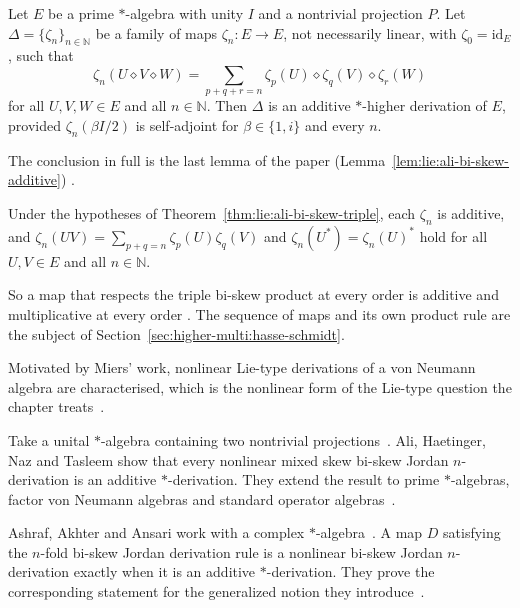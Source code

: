 \begin{theorem}\label{thm:lie:ali-bi-skew-triple}
Let $E$ be a prime $*$-algebra with unity $I$ and a nontrivial projection $P$.
Let $\Delta=\{\zeta_{n}\}_{n\in\mathbb{N}}$ be a family of maps
$\zeta_{n}\colon E\to E$, not necessarily linear, with
$\zeta_{0}=\mathrm{id}_{E}$, such that
\[
\zeta_{n}(U\diamond V\diamond W)
=\sum_{p+q+r=n}\zeta_{p}(U)\diamond\zeta_{q}(V)\diamond\zeta_{r}(W)
\]
for all $U,V,W\in E$ and all $n\in\mathbb{N}$. Then $\Delta$ is an additive
$*$-higher derivation of $E$, provided $\zeta_{n}(\beta I/2)$ is self-adjoint
for $\beta\in\{1,i\}$ and every $n$.
\end{theorem}

The conclusion in full is the last lemma of the paper
(Lemma~\ref{lem:lie:ali-bi-skew-additive}) \cite[p.~136]{AliAliTasleem2026}.

\begin{lemma}\label{lem:lie:ali-bi-skew-additive}
Under the hypotheses of Theorem~\ref{thm:lie:ali-bi-skew-triple}, each
$\zeta_{n}$ is additive, and
$\zeta_{n}(UV)=\sum_{p+q=n}\zeta_{p}(U)\zeta_{q}(V)$ and
$\zeta_{n}(U^{*})=\zeta_{n}(U)^{*}$ hold for all $U,V\in E$ and all $n\in\mathbb{N}$.
\end{lemma}

So a map that respects the triple bi-skew product at every order is additive
and multiplicative at every order \cite[p.~136]{AliAliTasleem2026}. The
sequence of maps and its own product rule are the subject of
Section~\ref{sec:higher-multi:hasse-schmidt}.

Motivated by Miers' work, nonlinear Lie-type derivations of a von Neumann
algebra are characterised, which is the nonlinear form of the Lie-type
question the chapter treats~\cite{WlNonlinearLieTypeDerivationsOfV2013}.

Take a unital $*$-algebra containing two nontrivial projections~\cite{WlNonlinearMixedSkewBiSkewJordan2026}. Ali,
Haetinger, Naz and Tasleem show that every nonlinear mixed skew bi-skew Jordan
$n$-derivation is an additive $*$-derivation. They extend the result to prime %
$*$-algebras, factor von Neumann algebras and standard operator
algebras~\cite{WlNonlinearMixedSkewBiSkewJordan2026}.

Ashraf, Akhter and Ansari work with a complex $*$-algebra~\cite{WlNonlinearGeneralizedBiSkewJord2024}. A map $D$
satisfying the $n$-fold bi-skew Jordan derivation rule is a nonlinear bi-skew
Jordan $n$-derivation exactly when it is an additive $*$-derivation. They prove %
the corresponding statement for the generalized notion they
introduce~\cite{WlNonlinearGeneralizedBiSkewJord2024}.

